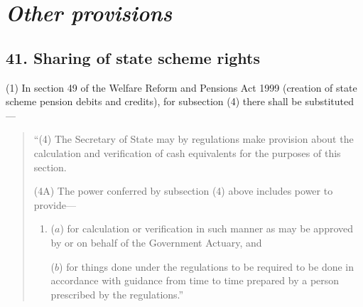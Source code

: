 \documentclass[12pt,a4paper]{article}
\begin{document}
\section{\itshape Other provisions}

%
%


\subsection{41. Sharing of state scheme rights}

(1) In section 49 of the Welfare Reform and Pensions Act 1999 (creation of state scheme pension debits and credits), for subsection (4)  there shall be substituted—
\begin{quotation}
“(4) The Secretary of State may by regulations make provision about the calculation and verification of cash equivalents for the purposes of this section.

(4A) The power conferred by subsection (4)  above includes power to provide—
\begin{enumerate}\item[]
($a$) for calculation or verification in such manner as may be approved by or on behalf of the Government Actuary, and

($b$) for things done under the regulations to be required to be done in accordance with guidance from time to time prepared by a person prescribed by the regulations.”
\end{enumerate}
\end{quotation}
\end{document}
